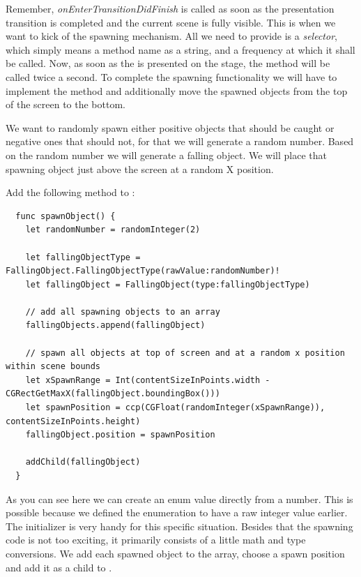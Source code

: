 Remember, \textit{onEnterTransitionDidFinish} is called as soon as the
presentation transition is completed and the current scene is fully visible.
This is when we want to kick of the spawning mechanism. 
All we need to provide is a \textit{selector}, which simply means a method name
as a string, and a frequency at which it shall be called. Now, as soon as the
 is presented on the stage, the 
method will be called twice a second.
To complete the spawning functionality we will have to implement the
 method and additionally move the spawned objects from
the top of the screen to the bottom.

We want to randomly spawn either positive objects that should be caught or
negative ones that should not, for that we will generate a random number. Based
on the random number we will generate a falling object. We will place that
spawning object just above the screen at a random X position. 

\begin{leftbar}
Add the following  method to :
\begin{lstlisting}
  func spawnObject() {
    let randomNumber = randomInteger(2)
    
    let fallingObjectType = FallingObject.FallingObjectType(rawValue:randomNumber)!
    let fallingObject = FallingObject(type:fallingObjectType)
    
    // add all spawning objects to an array
    fallingObjects.append(fallingObject)
    
    // spawn all objects at top of screen and at a random x position within scene bounds
    let xSpawnRange = Int(contentSizeInPoints.width - CGRectGetMaxX(fallingObject.boundingBox()))
    let spawnPosition = ccp(CGFloat(randomInteger(xSpawnRange)), contentSizeInPoints.height)
    fallingObject.position = spawnPosition
    
    addChild(fallingObject)
  }
\end{lstlisting}
\end{leftbar}

As you can see here we can create an enum value directly from a number.
This is possible because we defined the 
enumeration to have a raw integer value earlier. The 
initializer is very handy for this specific situation. Besides that the spawning
code is not too exciting, it primarily consists of a little math and type
conversions. We add each spawned object to the  array,
choose a spawn position and add it as a child to .

